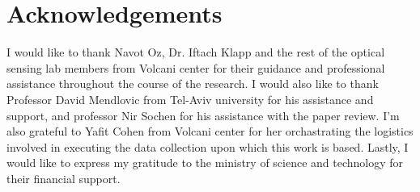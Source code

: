 \cleardoublepage%
\chapter*{Acknowledgements}%
\thispagestyle{empty}%

I would like to thank Navot Oz, Dr. Iftach Klapp and the rest of the optical sensing lab members from Volcani center for their guidance and professional assistance throughout the course of the research.
I would also like to thank Professor David Mendlovic from Tel-Aviv university for his assistance and support, and professor Nir Sochen for his assistance with the paper review.
I'm also grateful to Yafit Cohen from Volcani center for her orchastrating the logistics involved in executing the data collection upon which this work is based.
Lastly, I would like to express my gratitude to the ministry of science and technology for their financial support.